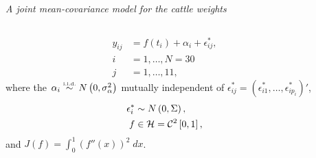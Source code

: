 \begin{frame}{\textit{A joint mean-covariance model for the cattle weights}}
\begin{columns}
\begin{column}{6cm}
\begin{align*}
y_{ij} &= f\left(t_i  \right) + \alpha_i + \epsilon^*_{ij}, \\
 i &= 1, \dots, N=30\\ 
 j &= 1, \dots, 11,
\end{align*} 
where the $\alpha_i \stackrel{\mbox{\tiny{i.i.d.}}}{\sim} N\left(0 ,\sigma_\alpha^2\right)$ mutually independent of $ \epsilon^*_{ij} = \left( \epsilon^*_{i1},\dots, \epsilon^*_{ip_i} \right)'$,
\begin{align*}
\epsilon^*_i &\sim N\left(0, \Sigma\right),\\
f &\in \mathcal{H}  = \mathcal{C}^2\left[0,1\right],
\end{align*} \footnotesize
and $J\left(f\right) = \int_0^1 \left(f''\left(x\right)\right)^2\;dx$.
\end{column}
\begin{column}{5.5cm}
\centering
{}
\end{column}
\end{columns} 
\end{frame}


